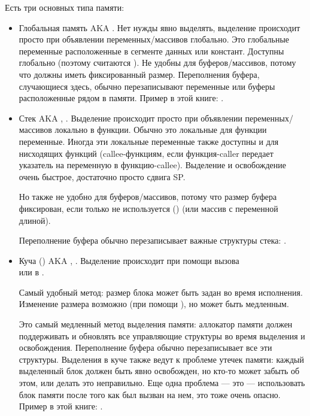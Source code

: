 ﻿

Есть три основных типа памяти:

\begin{itemize}
\item
Глобальная память \ac{AKA} .
Нет нужды явно выделять, выделение происходит просто при объявлении переменных/массивов 
глобально.
Это глобальные переменные расположенные в сегменте данных или констант.
Доступны глобально (поэтому считаются ).
Не удобны для буферов/массивов, потому что должны иметь фиксированный размер.
Переполнения буфера, случающиеся здесь, обычно перезаписывают переменные или буферы
расположенные рядом в памяти.
Пример в этой книге: .

\item
Стек \ac{AKA} , .
Выделение происходит просто при объявлении переменных/массивов локально в функции.%
Обычно это локальные для функции переменные.
Иногда эти локальные переменные также доступны и для нисходящих функций (\gls{callee}-функциям, если функция-\gls{caller} передает
указатель на переменную в функцию-\gls{callee}).
Выделение и освобождение очень быстрое, достаточно просто сдвига \ac{SP}.

Но также не удобно для буферов/массивов, потому что размер буфера фиксирован,
если только не используется  () (или массив с переменной длиной).

Переполнение буфера обычно перезаписывает важные структуры стека: .

\item
Куча () \ac{AKA} , .
Выделение происходит при помощи вызова \\
 или  в \Cpp.

Самый удобный метод: размер блока может быть задан во время исполнения.
Изменение размера возможно (при помощи ), но может быть медленным.

Это самый медленный метод выделения памяти: аллокатор памяти должен поддерживать и обновлять
все управляющие структуры во время выделения и освобождения.
Переполнение буфера обычно перезаписывает все эти структуры.
Выделения в куче также ведут к проблеме утечек памяти: каждый выделенный блок должен быть
явно освобожден, но кто-то может забыть об этом, или делать это неправильно.
Еще одна проблема --- это  --- использовать блок памяти после
того как  был вызван на нем, это тоже очень опасно.
Пример в этой книге:
.

\end{itemize}
